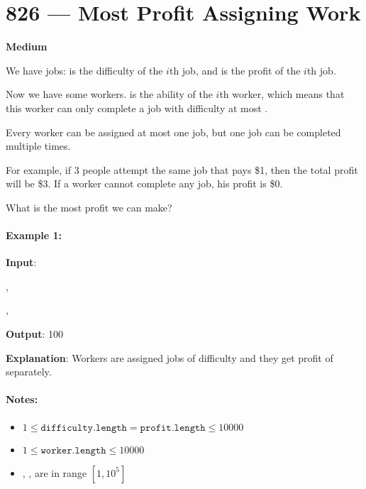 \section{826 --- Most Profit Assigning Work}

\textbf{Medium}

We have jobs:  is the difficulty of the $i$th job, and  is the profit of the $i$th job. 

Now we have some workers.  is the ability of the $i$th worker, which means that this worker can only complete a job with difficulty at most . 

Every worker can be assigned at most one job, but one job can be completed multiple times.

For example, if 3 people attempt the same job that pays \$1, then the total profit will be \$3.  If a worker cannot complete any job, his profit is \$0.

What is the most profit we can make?

\paragraph{Example 1:}

\begin{flushleft}
\textbf{Input}: 

, 

, 


\textbf{Output}: 100 

\textbf{Explanation}: Workers are assigned jobs of difficulty \fcj{[4,4,6,6]} and they get profit of \fcj{[20,20,30,30]} separately.
\end{flushleft}

\paragraph{Notes:}

\begin{itemize}
\item $1 \leq \texttt{difficulty.length} = \texttt{profit.length} \leq 10000$
\item $1 \leq \texttt{worker.length} \leq 10000$
\item {}, ,   are in range $[1, 10^5]$
\end{itemize}

